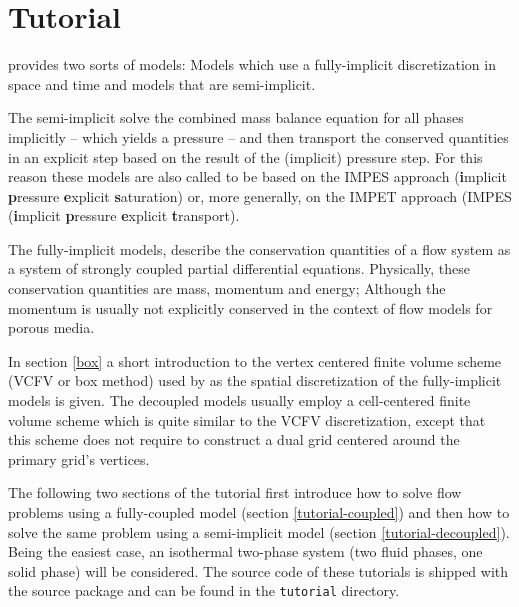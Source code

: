 \chapter[Tutorial]{Tutorial}\label{chp:tutorial}

\eWoms provides two sorts of models: Models which use a fully-implicit
discretization in space and time and models that are
semi-implicit. 

The semi-implicit solve the combined mass balance equation for all
phases implicitly -- which yields a pressure -- and then transport the
conserved quantities in an explicit step based on the result of the
(implicit) pressure step. For this reason these models are also called
to be based on the IMPES approach (\textbf{i}mplicit \textbf{p}ressure
\textbf{e}xplicit \textbf{s}aturation) or, more generally, on the
IMPET approach (IMPES (\textbf{i}mplicit \textbf{p}ressure
\textbf{e}xplicit \textbf{t}ransport).

The fully-implicit models, describe the conservation quantities of a
flow system as a system of strongly coupled partial differential
equations. Physically, these conservation quantities are mass,
momentum and energy; Although the momentum is usually not explicitly
conserved in the context of flow models for porous media.

In section \ref{box} a short introduction to the vertex centered
finite volume scheme (VCFV or box method) used by \eWoms as the
spatial discretization of the fully-implicit models is given. The
decoupled models usually employ a cell-centered finite volume scheme
which is quite similar to the VCFV discretization, except that this
scheme does not require to construct a dual grid centered around the
primary grid's vertices.


The following two sections of the tutorial first introduce how to
solve flow problems using a fully-coupled model (section
\ref{tutorial-coupled}) and then how to solve the same problem using a
semi-implicit model (section \ref{tutorial-decoupled}). Being the
easiest case, an isothermal two-phase system (two fluid phases, one
solid phase) will be considered. The source code of these tutorials is
shipped with the \eWoms source package and can be found in the
\texttt{tutorial} directory.



%

